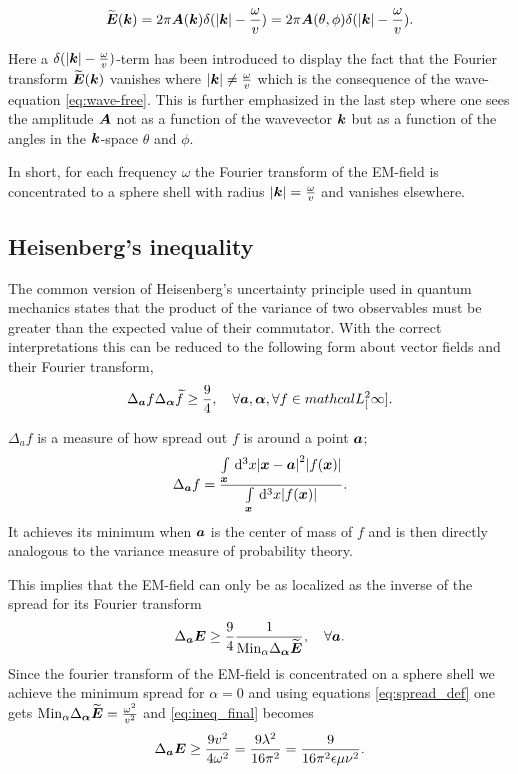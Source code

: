 \documentclass[11pt,a4paper, 
english, swedish %
]{article}
\newcommand{\Lsq}[1]{\ensuremath{mathcal{L}^2_{#1}}}
\begin{document}
\begin{equation}
  \label{eq:f-transf}
  \widetilde{\vb*E}(\vb*k)=2\pi\vb*A(\vb*k)\delta(\abs{\vb*k}-\frac{\omega}{v})=2\pi\vb*A(\theta,\phi)\delta(\abs{\vb*k}-\frac{\omega}{v}).
\end{equation}

Here a $\delta(\abs{\vb*k}-\frac{\omega}{v})$-term has been introduced to display the fact that the Fourier transform $\widetilde{\vb*E}(\vb*k)$ vanishes where $\abs{\vb*k} \neq\frac{\omega}{v}$ which is the consequence of the wave-equation \ref{eq:wave-free}.
This is further emphasized in the last step where one sees the amplitude $\vb*A$ not as a function of the wavevector $\vb*k$ but as a function of the angles in the $\vb*k$-space $\theta$ and $\phi$.

In short, for each frequency $\omega$ the Fourier transform of the EM-field is concentrated to a sphere shell with radius $\abs{\vb*k}=\frac{\omega}{v}$ and vanishes elsewhere.

\subsection{Heisenberg's inequality}
The common version of Heisenberg's uncertainty principle used in quantum mechanics states that the product of the variance of two observables must be greater than the expected value of their commutator. With the correct interpretations this can be reduced to the following form about vector fields and their Fourier transform, 
\begin{equation}
\Delta_{\vb*a}f \Delta_{\vb*\alpha} \widetilde{f} \geq \frac{9}{4}, \quad \forall \vb*a, \vb*\alpha, \forall f \in \Lsq[\infty].
\end{equation}

$\Delta_af$ is a measure of how spread out $f$ is around a point $\vb*a$;
\begin{equation}
  \label{eq:spread_def}
\Delta_{\vb*a}f=\frac{\int_{\vb*x}\id^3x\abs{\vb*x-\vb*a}^2\abs{f(\vb*x)}}{\int_{\vb*x}\id^3x\abs{f(\vb*x)}}.
\end{equation}
It achieves its minimum when $\vb*a$ is the center of mass of $f$ and is then directly analogous to the variance measure of probability theory.

This implies that the EM-field can only be as localized as the inverse of the spread for its Fourier transform
\begin{equation}
  \label{eq:ineq_final}
  \Delta_{\vb*a}\vb*E\geq \frac{9}{4} \frac{1}{\mathrm{Min}_\alpha\Delta_{\vb*\alpha}\widetilde{\vb*E}}, \quad \forall \vb*a.
\end{equation}
Since the fourier transform of the EM-field is concentrated on a sphere shell we achieve the minimum spread for $\alpha=0$ and using equations \ref{eq:spread_def} one gets
$\mathrm{Min}_\alpha\Delta_{\vb*\alpha}\widetilde{\vb*E}=\frac{\omega^2}{v^2}$ and \ref{eq:ineq_final} becomes
\begin{equation}
 \Delta_{\vb*a}\vb*E\geq \frac{9v^2}{4\omega^2}=\frac{9\lambda^2}{16\pi^2}=\frac{9}{16\pi^2\epsilon\mu\nu^2}.
 \end{equation}
\end{document}
